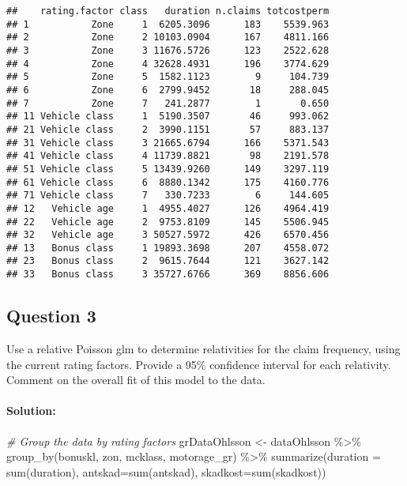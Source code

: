 \documentclass[
]{article}
\newenvironment{Shaded}{\begin{snugshade}}{\end{snugshade}}
\newcommand{\AttributeTok}[1]{\textcolor[rgb]{0.77,0.63,0.00}{#1}}
\newcommand{\CommentTok}[1]{\textcolor[rgb]{0.56,0.35,0.01}{\textit{#1}}}
\newcommand{\FunctionTok}[1]{\textcolor[rgb]{0.00,0.00,0.00}{#1}}
\newcommand{\NormalTok}[1]{#1}
\newcommand{\OtherTok}[1]{\textcolor[rgb]{0.56,0.35,0.01}{#1}}
\newcommand{\SpecialCharTok}[1]{\textcolor[rgb]{0.00,0.00,0.00}{#1}}
\begin{document}
\begin{verbatim}
##    rating.factor class   duration n.claims totcostperm
## 1           Zone     1  6205.3096      183    5539.963
## 2           Zone     2 10103.0904      167    4811.166
## 3           Zone     3 11676.5726      123    2522.628
## 4           Zone     4 32628.4931      196    3774.629
## 5           Zone     5  1582.1123        9     104.739
## 6           Zone     6  2799.9452       18     288.045
## 7           Zone     7   241.2877        1       0.650
## 11 Vehicle class     1  5190.3507       46     993.062
## 21 Vehicle class     2  3990.1151       57     883.137
## 31 Vehicle class     3 21665.6794      166    5371.543
## 41 Vehicle class     4 11739.8821       98    2191.578
## 51 Vehicle class     5 13439.9260      149    3297.119
## 61 Vehicle class     6  8880.1342      175    4160.776
## 71 Vehicle class     7   330.7233        6     144.605
## 12   Vehicle age     1  4955.4027      126    4964.419
## 22   Vehicle age     2  9753.8109      145    5506.945
## 32   Vehicle age     3 50527.5972      426    6570.456
## 13   Bonus class     1 19893.3698      207    4558.072
## 23   Bonus class     2  9615.7644      121    3627.142
## 33   Bonus class     3 35727.6766      369    8856.606
\end{verbatim}

\hypertarget{question-3}{%
\subsection{Question 3}\label{question-3}}

Use a relative Poisson glm to determine relativities for the claim
frequency, using the current rating factors. Provide a 95\% confidence
interval for each relativity. Comment on the overall fit of this model
to the data.

\hypertarget{solution-2}{%
\paragraph{Solution:}\label{solution-2}}

\begin{Shaded}
\begin{Highlighting}[]
\CommentTok{\# Group the data by rating factors}
\NormalTok{grDataOhlsson }\OtherTok{\textless{}{-}}\NormalTok{ dataOhlsson }\SpecialCharTok{\%\textgreater{}\%} \FunctionTok{group\_by}\NormalTok{(bonuskl, zon, mcklass, motorage\_gr) }\SpecialCharTok{\%\textgreater{}\%} \FunctionTok{summarize}\NormalTok{(}\AttributeTok{duration =} \FunctionTok{sum}\NormalTok{(duration), }
                                                                                            \AttributeTok{antskad=}\FunctionTok{sum}\NormalTok{(antskad),}
                                                                                            \AttributeTok{skadkost=}\FunctionTok{sum}\NormalTok{(skadkost))}
\end{Highlighting}
\end{Shaded}
\end{document}

